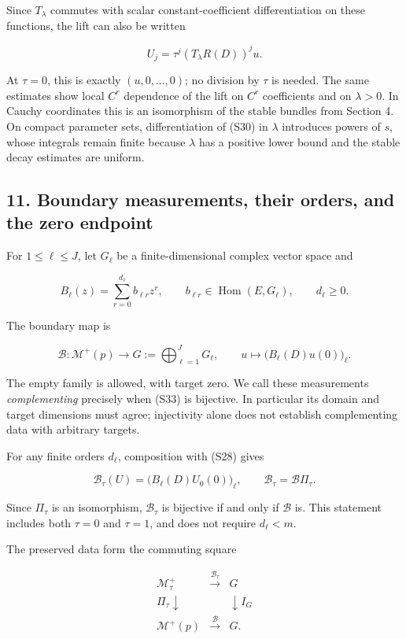 \documentclass[
  11pt,
]{article}
\begin{document}
Since \(T_\lambda\) commutes with scalar constant-coefficient
differentiation on these functions, the lift can also be written

\[
U_j=\tau^j(T_\lambda R(D))^ju.
\]

At \(\tau=0\), this is exactly \((u,0,\ldots,0)\); no division by
\(\tau\) is needed. The same estimates show local \(C^r\) dependence of
the lift on \(C^r\) coefficients and on \(\lambda>0\). In Cauchy
coordinates this is an isomorphism of the stable bundles from Section 4.
On compact parameter sets, differentiation of (S30) in \(\lambda\)
introduces powers of \(s\), whose integrals remain finite because
\(\lambda\) has a positive lower bound and the stable decay estimates
are uniform.

\subsection{11. Boundary measurements, their orders, and the zero
endpoint}\label{boundary-measurements-their-orders-and-the-zero-endpoint}

For \(1\leq\ell\leq J\), let \(G_\ell\) be a finite-dimensional complex
vector space and

\[
B_\ell(z)=\sum_{r=0}^{d_\ell}b_{\ell r}z^r,
\qquad b_{\ell r}\in\operatorname{Hom}(E,G_\ell),
\qquad d_\ell\geq0.
\]

The boundary map is

\[
\mathcal B:\mathcal M^+(p)\longrightarrow
G:=\bigoplus_{\ell=1}^J G_\ell,
\qquad
u\longmapsto\big(B_\ell(D)u(0)\big)_\ell.                 \tag{S33}
\]

The empty family is allowed, with target zero. We call these
measurements \emph{complementing} precisely when (S33) is bijective. In
particular its domain and target dimensions must agree; injectivity
alone does not establish complementing data with arbitrary targets.

For any finite orders \(d_\ell\), composition with (S28) gives

\[
\mathcal B_\tau(U)=\big(B_\ell(D)U_0(0)\big)_\ell,
\qquad \mathcal B_\tau=\mathcal B\Pi_\tau.                 \tag{S34}
\]

Since \(\Pi_\tau\) is an isomorphism, \(\mathcal B_\tau\) is bijective
if and only if \(\mathcal B\) is. This statement includes both
\(\tau=0\) and \(\tau=1\), and does not require \(d_\ell<m\).

The preserved data form the commuting square

\[
\begin{array}{ccc}
\mathcal M^+_\tau&\xrightarrow{\mathcal B_\tau}&G\\
\Pi_\tau\downarrow&&\downarrow I_G\\
\mathcal M^+(p)&\xrightarrow{\mathcal B}&G.
\end{array}
\]
\end{document}
